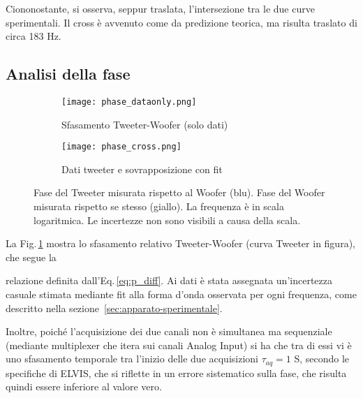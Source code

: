 \documentclass[../Relazione_circuiti]{subfiles}
\begin{document}
  Ciononostante, si osserva, seppur traslata, l'intersezione tra le due curve sperimentali. Il cross è avvenuto come da
  predizione teorica, ma risulta traslato di circa 183 Hz.

\subsection{Analisi della fase}

  \begin{figure}[H]
    \centering

    \begin{subfigure}{=0.49\textwidth}
      \centering
      \texttt{[image: phase\_dataonly.png]}
      \caption{Sfasamento Tweeter-Woofer (solo dati)}
      \label{fig:pdiff_dataonly}

    \end{subfigure}
    \hfill
    \begin{subfigure}{=0.49\textwidth}
      \centering
      \texttt{[image: phase\_cross.png]}
      \caption{Dati tweeter e sovrapposizione con fit}
      \label{fig:pdiff_fit_data}

    \end{subfigure}

    \caption{
      Fase del Tweeter misurata rispetto al Woofer (blu). Fase del Woofer misurata rispetto se stesso (giallo).
      La frequenza è in scala logaritmica. Le incertezze non sono visibili a causa della scala.
    }
    \label{fig:phase_diff}

  \end{figure}

  La Fig.\,\ref{fig:pdiff_dataonly} mostra lo sfasamento relativo Tweeter-Woofer (curva Tweeter in figura), che segue la

  relazione definita dall'Eq.\,\eqref{eq:p_diff}.
  Ai dati è stata assegnata un'incertezza casuale stimata mediante fit alla forma d'onda osservata per ogni frequenza,
  come descritto nella sezione~\ref{sec:apparato-sperimentale}.

  Inoltre, poiché l'acquisizione dei due canali non è simultanea ma sequenziale (mediante multiplexer che itera sui
  canali Analog Input) si ha che tra di essi vi è uno sfasamento temporale tra l'inizio delle due acquisizioni
  $\tau_{aq}=1$ \textmu S, secondo le specifiche di ELVIS, che si riflette in un errore
  sistematico sulla fase, che risulta quindi essere inferiore al valore vero.
\end{document}
